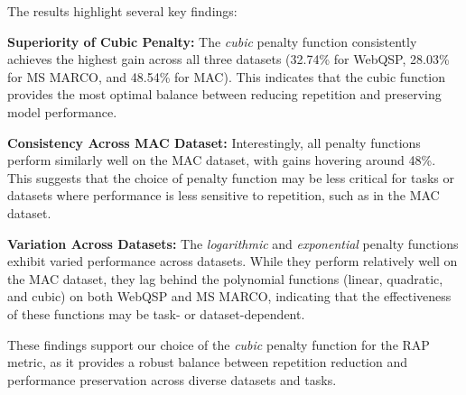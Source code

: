 The results highlight several key findings:

\noindent \textbf{Superiority of Cubic Penalty:} The \textit{cubic} penalty function consistently achieves the highest gain across all three datasets (32.74\% for WebQSP, 28.03\% for MS MARCO, and 48.54\% for MAC). This indicates that the cubic function provides the most optimal balance between reducing repetition and preserving model performance.

\noindent \textbf{Consistency Across MAC Dataset:} Interestingly, all penalty functions perform similarly well on the MAC dataset, with gains hovering around 48\%. This suggests that the choice of penalty function may be less critical for tasks or datasets where performance is less sensitive to repetition, such as in the MAC dataset.

\noindent \textbf{Variation Across Datasets:} The \textit{logarithmic} and \textit{exponential} penalty functions exhibit varied performance across datasets. While they perform relatively well on the MAC dataset, they lag behind the polynomial functions (linear, quadratic, and cubic) on both WebQSP and MS MARCO, indicating that the effectiveness of these functions may be task- or dataset-dependent.

These findings support our choice of the \textit{cubic} penalty function for the RAP metric, as it provides a robust balance between repetition reduction and performance preservation across diverse datasets and tasks.